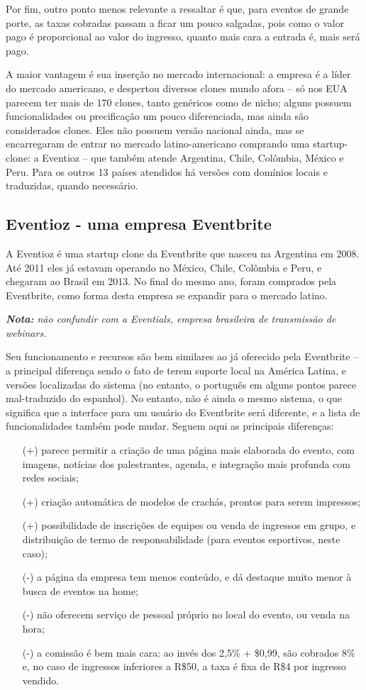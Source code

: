 \documentclass[a4paper]{abntex2}
\begin{document}
Por fim, outro ponto menos relevante a ressaltar é que, para eventos de grande porte, as taxas cobradas passam a ficar um pouco salgadas, pois como o valor pago é proporcional ao valor do ingresso, quanto mais cara a entrada é, mais será pago.

A maior vantagem é sua inserção no mercado internacional: a empresa é a líder do mercado americano, e despertou diversos clones mundo afora -- só nos EUA parecem ter mais de 170 clones, tanto genéricos como de nicho\cite{eventbrite-concorrencia}; alguns possuem funcionalidades ou precificação um pouco diferenciada\cite{eventbrite-concorrencia-quora}, mas ainda são considerados clones. Eles não possuem versão nacional ainda, mas se encarregaram de entrar no mercado latino-americano comprando uma startup-clone: a Eventioz -- que também atende Argentina, Chile, Colômbia, México e Peru. Para os outros 13 países atendidos há versões com domínios locais e traduzidas, quando necessário.

\subsection{Eventioz - uma empresa Eventbrite}
A Eventioz é uma startup clone da Eventbrite que nasceu na Argentina em 2008. Até 2011 eles já estavam operando no México, Chile, Colômbia e Peru, e chegaram ao Brasil em 2013. No final do mesmo ano, foram comprados pela Eventbrite, como forma desta empresa se expandir para o mercado latino.

\emph{\textbf{Nota:} não confundir com a Eventials, empresa brasileira de transmissão de webinars.}

Seu funcionamento e recursos são bem similares ao já oferecido pela Eventbrite -- a principal diferença sendo o fato de terem suporte local na América Latina, e versões localizadas do sistema (no entanto, o português em alguns pontos parece mal-traduzido do espanhol). No entanto, não é ainda o mesmo sistema, o que significa que a interface para um usuário do Eventbrite será diferente, e a lista de funcionalidades também pode mudar. Seguem aqui as principais diferenças:
\begin{itemize}
	\item[(+)] parece permitir a criação de uma página mais elaborada do evento, com imagens, notícias dos palestrantes, agenda, e integração mais profunda com redes sociais;
	\item[(+)] criação automática de modelos de crachás, prontos para serem impressos;
	\item[(+)] possibilidade de inscrições de equipes ou venda de ingressos em grupo, e distribuição de termo de responsabilidade (para eventos esportivos, neste caso);
	\item[(-)] a página da empresa tem menos conteúdo, e dá destaque muito menor à busca de eventos na home;
	\item[(-)] não oferecem serviço de pessoal próprio no local do evento, ou venda na hora;
	\item[(-)] a comissão é bem mais cara: ao invés dos 2,5\% + \$0,99, são cobrados 8\% e, no caso de ingressos inferiores a R\$50, a taxa é fixa de R\$4 por ingresso vendido.
\end{itemize}
\end{document}
